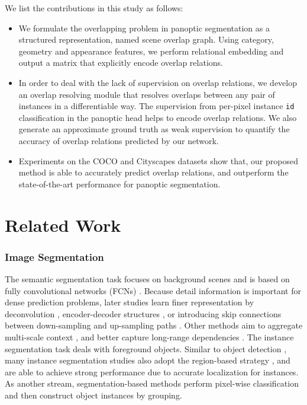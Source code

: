 \documentclass[letterpaper]{article} \usepackage{aaai20}  \usepackage{times}  \usepackage{helvet} \usepackage{courier}  \usepackage[hyphens]{url}  \usepackage{graphicx} \urlstyle{rm} \def\UrlFont{\rm}  \usepackage{graphicx}  \frenchspacing  \setlength{\pdfpagewidth}{8.5in}  \setlength{\pdfpageheight}{11in}
\begin{document}
We list the contributions in this study as follows:
\begin{itemize}
	\item We formulate the overlapping problem in panoptic segmentation as a structured representation, named scene overlap graph. Using category, geometry and appearance features, we perform relational embedding and output a matrix that explicitly encode overlap relations. 
	\item In order to deal with the lack of supervision on overlap relations, we develop an overlap resolving module that resolves overlaps between any pair of instances in a differentiable way. The supervision from per-pixel instance \verb|id| classification in the panoptic head helps to encode overlap relations. We also generate an approximate ground truth as weak supervision to quantify the accuracy of overlap relations predicted by our network. 
	\item Experiments on the COCO and Cityscapes datasets show that, our proposed method is able to accurately predict overlap relations, and outperform the state-of-the-art performance for panoptic segmentation. 
\end{itemize}



\section{Related Work}

\subsubsection{Image Segmentation}



The semantic segmentation task focuses on background scenes and is based on fully convolutional networks (FCNs) \cite{long2015fully}. Because detail information is important for dense prediction problems, later studies learn finer representation by deconvolution \cite{noh2015learning}, encoder-decoder structures \cite{badrinarayanan2017segnet}, or introducing skip connections between down-sampling and up-sampling paths \cite{ronneberger2015u}. Other methods aim to aggregate multi-scale context \cite{farabet2013learning,chen2018deeplab,zhao2017pyramid}, and better capture long-range dependencies \cite{zheng2015conditional,li2019expectation}. The instance segmentation task deals with foreground objects. Similar to object detection \cite{girshick2015fast,ren2015faster}, many instance segmentation studies \cite{li2017fully,he2017mask} also adopt the region-based strategy \cite{girshick2014rich}, and are able to achieve strong performance due to accurate localization for instances. As another stream, segmentation-based methods \cite{liang2018proposal,arnab2017pixelwise} perform pixel-wise classification and then construct object instances by grouping. 
\end{document}

